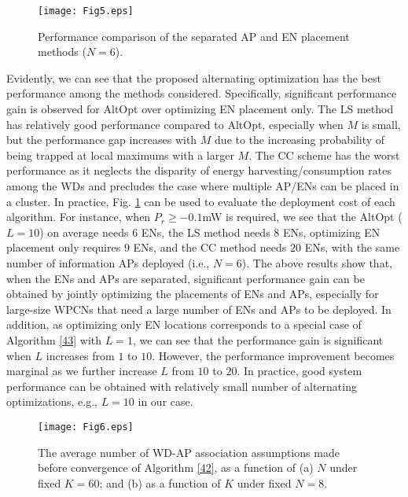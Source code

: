 \documentclass[journal, draftcls, one column, 12pt]{IEEEtran}
\begin{document}
\begin{figure}
\centering
  \begin{center}
    \texttt{[image: Fig5.eps]}
  \end{center}
  \caption{Performance comparison of the separated AP and EN placement methods ($N=6$).}
  \label{68}
\end{figure}

Evidently, we can see that the proposed alternating optimization has the best performance among the methods considered. Specifically, significant performance gain is observed for AltOpt over optimizing EN placement only. The LS method has relatively good performance compared to AltOpt, especially when $M$ is small, but the performance gap increases with $M$ due to the increasing probability of being trapped at local maximums with a larger $M$. The CC scheme has the worst performance as it neglects the disparity of energy harvesting/consumption rates among the WDs and precludes the case where multiple AP/ENs can be placed in a cluster. In practice, Fig. \ref{68} can be used to evaluate the deployment cost of each algorithm. For instance, when $P_r\geq -0.1$mW is required, we see that the AltOpt ($L=10$) on average needs $6$ ENs, the LS method needs $8$ ENs, optimizing EN placement only requires $9$ ENs, and the CC method needs $20$ ENs, with the same number of information APs deployed (i.e., $N=6$). The above results show that, when the ENs and APs are separated, significant performance gain can be obtained by jointly optimizing the placements of ENs and APs, especially for large-size WPCNs that need a large number of ENs and APs to be deployed. In addition, as optimizing only EN locations corresponds to a special case of Algorithm \ref{43} with $L=1$, we can see that the performance gain is significant when $L$ increases from $1$ to $10$. However, the performance improvement becomes marginal as we further increase $L$ from $10$ to $20$. In practice, good system performance can be obtained with relatively small number of alternating optimizations, e.g., $L=10$ in our case.


\begin{figure}
\centering
  \begin{center}
    \texttt{[image: Fig6.eps]}
  \end{center}
  \caption{The average number of WD-AP association assumptions made before convergence of Algorithm \ref{42}, as a function of (a) $N$ under fixed $K=60$; and (b) as a function of $K$ under fixed $N=8$.}
  \label{64}
\end{figure}
\end{document}
